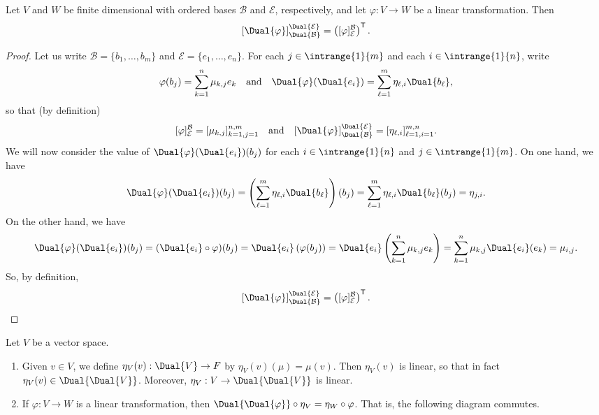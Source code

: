 \documentclass{memoir}
\begin{document}
\begin{prp}
Let $V$ and $W$ be finite dimensional with ordered bases $\mathcal{B}$ and $\mathcal{E}$, respectively, and let $\varphi : V \rightarrow W$ be a linear transformation. Then \[ [\Dual{\varphi}]^{\Dual{\mathcal{E}}}_{\Dual{\mathcal{B}}} = \left([\varphi]^\mathcal{B}_\mathcal{E}\right)^\mathsf{T}. \]
\end{prp}

\begin{proof}
Let us write $\mathcal{B} = \{ b_1, \ldots, b_m \}$ and $\mathcal{E} = \{e_1, \ldots, e_n \}$. For each $j \in \intrange{1}{m}$ and each $i \in \intrange{1}{n}$, write \[ \varphi(b_j) = \sum_{k=1}^n \mu_{k,j} e_k \quad \mathrm{and} \quad \Dual{\varphi}(\Dual{e_i}) = \sum_{\ell=1}^m \eta_{\ell,i} \Dual{b_\ell}, \] so that (by definition) \[ [\varphi]^\mathcal{B}_\mathcal{E} = [\mu_{k,j}]_{k=1,j=1}^{n,m} \quad \mathrm{and} \quad [\Dual{\varphi}]^{\Dual{\mathcal{E}}}_{\Dual{\mathcal{B}}} = [\eta_{\ell,i}]_{\ell=1,i=1}^{m,n}. \] We will now consider the value of $\Dual{\varphi}(\Dual{e_i})(b_j)$ for each $i \in \intrange{1}{n}$ and $j \in \intrange{1}{m}$. On one hand, we have \[ \Dual{\varphi}(\Dual{e_i})(b_j) = \left( \sum_{\ell=1}^m \eta_{\ell,i} \Dual{b_\ell} \right)(b_j) = \sum_{\ell=1}^m \eta_{\ell,i} \Dual{b_\ell}(b_j) = \eta_{j,i}. \] On the other hand, we have \[ \Dual{\varphi}(\Dual{e_i})(b_j) = (\Dual{e_i} \circ \varphi)(b_j) = \Dual{e_i}\left( \varphi(b_j) \right) = \Dual{e_i}\left( \sum_{k=1}^n \mu_{k,j} e_k \right) = \sum_{k=1}^n \mu_{k,j} \Dual{e_i}(e_k) = \mu_{i,j}. \] So, by definition, \[ [\Dual{\varphi}]^{\Dual{\mathcal{E}}}_{\Dual{\mathcal{B}}} = \left([\varphi]^\mathcal{B}_\mathcal{E}\right)^\mathsf{T}. \qedhere \]
\end{proof}

\begin{prp}
Let $V$ be a vector space. 
\begin{enumerate}
\item Given $v \in V$, we define $\eta_V(v) : \Dual{V} \rightarrow F$ by $\eta_V(v)(\mu) = \mu(v)$. Then $\eta_V(v)$ is linear, so that in fact $\eta_V(v) \in \Dual{\Dual{V}}$. Moreover, $\eta_V : V \rightarrow \Dual{\Dual{V}}$ is linear.
\item If $\varphi : V \rightarrow W$ is a linear transformation, then $\Dual{\Dual{\varphi}} \circ \eta_V = \eta_W \circ \varphi$. That is, the following diagram commutes.

\begin{center}
\end{center}
\end{enumerate}
\end{prp}
\end{document}
